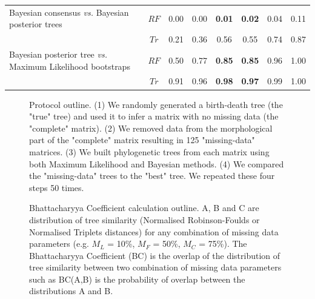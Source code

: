 \documentclass[12pt,letterpaper]{article}
\begin{document}
\begin{landscape}
\begin{table}[ht]
\begin{tabular}{lccccccc}
    Bayesian consensus \textit{vs.} Bayesian posterior trees           & $RF$ & 0.00 & 0.00 & \textbf{0.01} & \textbf{0.02} & 0.04 & 0.11 \\ 
                                                                       & $Tr$ & 0.21 & 0.36 & 0.56 & 0.55 & 0.74 & 0.87 \\ 
    Bayesian posterior tree \textit{vs.} Maximum Likelihood bootstraps & $RF$ & 0.50 & 0.77 & \textbf{0.85} & \textbf{0.85} & 0.96 & 1.00 \\ 
                                                                       & $Tr$ & 0.91 & 0.96 & \textbf{0.98} & \textbf{0.97} & 0.99 & 1.00 \\ 
   \hline
\end{tabular}
\label{Tab_Results-Difference_methods}
\end{table}
\end{landscape}



\begin{figure}
\caption{Protocol outline.
(1) We randomly generated a birth-death tree (the "true" tree) and used it to infer a matrix with no missing data (the "complete" matrix).
(2) We removed data from the morphological part of the "complete" matrix resulting in 125 "missing-data" matrices.
(3) We built phylogenetic trees from each matrix using both Maximum Likelihood and Bayesian methods.
(4) We compared the "missing-data" trees to the "best" tree.
We repeated these four steps 50 times.}
\label{Fig_Outline}
\end{figure}

\begin{figure}
\caption{Bhattacharyya Coefficient calculation outline. A, B and C are distribution of tree similarity (Normalised Robinson-Foulds or Normalised Triplets distances) for any combination of missing data parameters (e.g. $M_{L}$ = 10\%, $M_{F}$ = 50\%, $M_{C}$ = 75\%). The Bhattacharyya Coefficient (BC) is the overlap of the distribution of tree similarity between two combination of missing data parameters such as BC(A,B) is the probability of overlap between the distributions A and B.}
\label{Fig_Bhattacharyya_Coefficients1} %
\end{figure}
\end{document}
